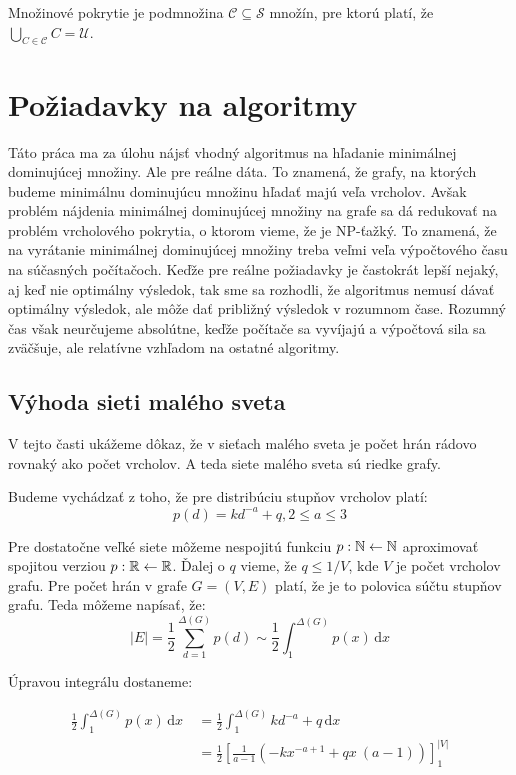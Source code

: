 Množinové pokrytie je podmnožina $\mathcal{C} \subseteq \mathcal{S}$ množín, 
pre ktorú platí, že $\bigcup_{C \in \mathcal{C}} C = \mathcal{U}$.

\section{Požiadavky na algoritmy}

Táto práca ma za úlohu nájsť vhodný algoritmus na hľadanie minimálnej 
dominujúcej množiny. Ale pre reálne dáta. To znamená, že grafy, na ktorých 
budeme minimálnu dominujúcu množinu hľadať majú veľa vrcholov. Avšak problém 
nájdenia minimálnej dominujúcej množiny na grafe sa dá redukovať na problém 
vrcholového pokrytia, o ktorom vieme, že je NP-ťažký. To znamená, že na 
vyrátanie minimálnej dominujúcej množiny treba veľmi veľa výpočtového času na 
súčasných počítačoch. Keďže pre reálne požiadavky je častokrát lepší nejaký, 
aj keď nie optimálny výsledok, tak sme sa rozhodli, že algoritmus nemusí dávať 
optimálny výsledok, ale môže dať približný výsledok v rozumnom čase. Rozumný 
čas však neurčujeme absolútne, keďže počítače sa vyvíjajú a výpočtová sila sa 
zväčšuje, ale relatívne vzhľadom na ostatné algoritmy.

\subsection{Výhoda sieti malého sveta}

V tejto časti ukážeme dôkaz, že v sieťach malého sveta je počet hrán rádovo 
rovnaký ako počet vrcholov. A teda siete malého sveta sú riedke grafy. 

Budeme vychádzať z toho, že pre distribúciu stupňov vrcholov platí:
$$p(d) = kd^{-a} + q, 2 \leq a \leq 3$$

Pre dostatočne veľké siete môžeme nespojitú funkciu $p : \mathbb{N} \leftarrow \mathbb{N}$ 
aproximovať spojitou verziou $p : \mathbb{R} \leftarrow \mathbb{R}$. Ďalej o $q$ vieme, že 
$q \leq 1/V$, kde $V$ je počet vrcholov grafu. Pre počet hrán v grafe 
$G = (V, E)$ platí, že je to polovica súčtu stupňov grafu. Teda môžeme napísať, 
že: $$|E| = \frac{1}{2}\sum_{d = 1}^{\Delta(G)} p(d) \sim 
\frac{1}{2}\int_1^{\Delta (G)} \! p(x) \, \mathrm{d}x$$

Úpravou integrálu dostaneme:

\begin{align*}
\frac{1}{2}\int_1^{\Delta (G)} \! p(x) \, \mathrm{d}x \
&= \frac{1}{2}\int_1^{\Delta (G)} \! kd^{-a} + q \, \mathrm{d}x \\
&= \frac{1}{2}\left[\frac{1}{a - 1} \left(- k x^{- a + 1} + q x \
\left(a - 1\right)\right)\right]_1^{|V|}
\end{align*}

